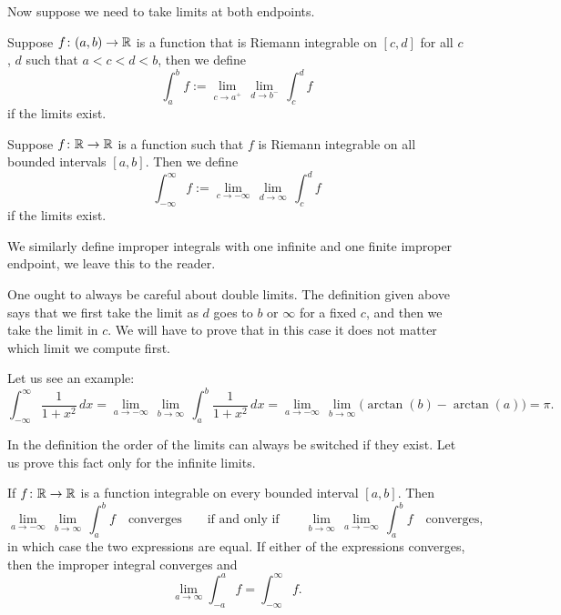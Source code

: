 Now suppose we need to take limits at both endpoints.

\begin{defn}
Suppose $f \colon (a,b) \to {\mathbb{R}}$ is a function
that is Riemann integrable on $[c,d]$ for all $c$, $d$
such that $a < c < d < b$, then we define
\begin{equation*}
\int_a^b f := \lim_{c \to a^+} \, \lim_{d \to b^-} \, \int_{c}^{d} f
\end{equation*}
if the limits exist.

Suppose $f \colon {\mathbb{R}} \to {\mathbb{R}}$ is a function such that
$f$ is Riemann integrable on all bounded intervals $[a,b]$.  Then
we define
\begin{equation*}
\int_{-\infty}^\infty f := \lim_{c \to -\infty} \, \lim_{d \to \infty} \, \int_c^d f
\end{equation*}
if the limits exist.

We similarly define improper integrals with one infinite and one finite
improper endpoint, we leave this to the reader.
\end{defn}

One ought to always be careful about double limits.  The definition
given above says that we first take the limit as $d$ goes to $b$ or
$\infty$ for a fixed $c$, and then we take the limit in $c$.
We will have to prove that in this case it does not matter which limit
we compute first.

\begin{example}
Let us see an example:
\begin{equation*}
\int_{-\infty}^\infty \frac{1}{1+x^2} \, dx
=
\lim_{a \to -\infty} \, \lim_{b \to \infty} \,
\int_{a}^b \frac{1}{1+x^2} \, dx
=
\lim_{a \to -\infty} \, \lim_{b \to \infty}
\bigl( \arctan(b) - \arctan(a) \bigr)
=
\pi .
\end{equation*}
\end{example}

In the definition the order of the limits can always be switched if they
exist.  Let us prove this fact only for the infinite limits.

\begin{prop}
If $f \colon {\mathbb{R}} \to {\mathbb{R}}$ is a function integrable on every bounded interval
$[a,b]$.
Then 
\begin{equation*}
\lim_{a \to -\infty} \, \lim_{b \to \infty} \, \int_a^b f
\quad \text{converges} \qquad \text{if and only if} \qquad
\lim_{b \to \infty}
\,
\lim_{a \to -\infty}
\,
\int_a^b f
\quad
\text{converges,}
\end{equation*}
in which case the two
expressions are equal.  If either of the
expressions converges, then the improper integral converges and
\begin{equation*}
\lim_{a\to\infty}
\int_{-a}^a f
=
\int_{-\infty}^\infty f .
\end{equation*}
\end{prop}

